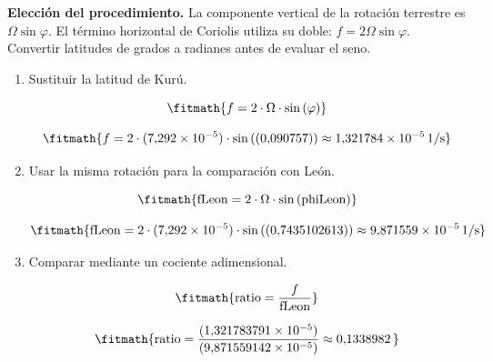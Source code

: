 \noindent\textbf{Elección del procedimiento.} La componente vertical de la rotación terrestre es $\Omega\sin\varphi$. El término horizontal de Coriolis utiliza su doble: $f=2\Omega\sin\varphi$. Convertir latitudes de grados a radianes antes de evaluar el seno.

\begin{enumerate}

\item Sustituir la latitud de Kurú.

\[\fitmath{f=2\cdot \Omega\cdot \sin\left(\varphi\right)}\]

\[\fitmath{f=2\cdot (7{,}292\times10^{-5})\cdot \sin\left((0{,}090757)\right)\approx 1{,}321784\times10^{-5}\,\mathrm{1/s}}\]

\item Usar la misma rotación para la comparación con León.

\[\fitmath{\mathrm{fLeon}=2\cdot \Omega\cdot \sin\left(\mathrm{phiLeon}\right)}\]

\[\fitmath{\mathrm{fLeon}=2\cdot (7{,}292\times10^{-5})\cdot \sin\left((0{,}7435102613)\right)\approx 9{,}871559\times10^{-5}\,\mathrm{1/s}}\]

\item Comparar mediante un cociente adimensional.

\[\fitmath{\mathrm{ratio}=\frac{f}{\mathrm{fLeon}}}\]

\[\fitmath{\mathrm{ratio}=\frac{(1{,}321783791\times10^{-5})}{(9{,}871559142\times10^{-5})}\approx 0{,}1338982\,}\]

\end{enumerate}
